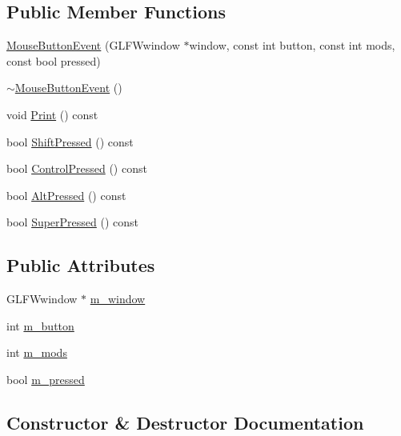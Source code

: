 \subsection*{Public Member Functions}
\begin{DoxyCompactItemize}
\item 
\mbox{\hyperlink{structec_1_1_mouse_button_event_aa7c76016af8d30e5c5486d5249568414}{Mouse\+Button\+Event}} (G\+L\+F\+Wwindow $\ast$window, const int button, const int mods, const bool pressed)
\item 
\mbox{\hyperlink{structec_1_1_mouse_button_event_af4e546257a07f8500dea2b49a79d644d}{$\sim$\+Mouse\+Button\+Event}} ()
\item 
void \mbox{\hyperlink{structec_1_1_mouse_button_event_a6149d796ef4dcd8bfd4540c79f8d6879}{Print}} () const
\item 
bool \mbox{\hyperlink{structec_1_1_mouse_button_event_afcdeea2b5b819f7dd5a82398fe400aca}{Shift\+Pressed}} () const
\item 
bool \mbox{\hyperlink{structec_1_1_mouse_button_event_a47190821b20fc37538379471836aa211}{Control\+Pressed}} () const
\item 
bool \mbox{\hyperlink{structec_1_1_mouse_button_event_a2a63bd0d1b22a8afe549fa49d920643c}{Alt\+Pressed}} () const
\item 
bool \mbox{\hyperlink{structec_1_1_mouse_button_event_a6cedd70bc22c194bcf3b3badeac58551}{Super\+Pressed}} () const
\end{DoxyCompactItemize}
\subsection*{Public Attributes}
\begin{DoxyCompactItemize}
\item 
G\+L\+F\+Wwindow $\ast$ \mbox{\hyperlink{structec_1_1_mouse_button_event_ab83fb7bb5cd28b90c48fd6327fe45f9c}{m\+\_\+window}}
\item 
int \mbox{\hyperlink{structec_1_1_mouse_button_event_a98e02b29b7b5bd6c1923b7b09641ed9e}{m\+\_\+button}}
\item 
int \mbox{\hyperlink{structec_1_1_mouse_button_event_afab73baa804fd9b9ab63846acf2274a9}{m\+\_\+mods}}
\item 
bool \mbox{\hyperlink{structec_1_1_mouse_button_event_ab8a22a5ef68729a7227d60b9b58bd438}{m\+\_\+pressed}}
\end{DoxyCompactItemize}


\subsection{Constructor \& Destructor Documentation}
\mbox{\label{structec_1_1_mouse_button_event_aa7c76016af8d30e5c5486d5249568414}} 
